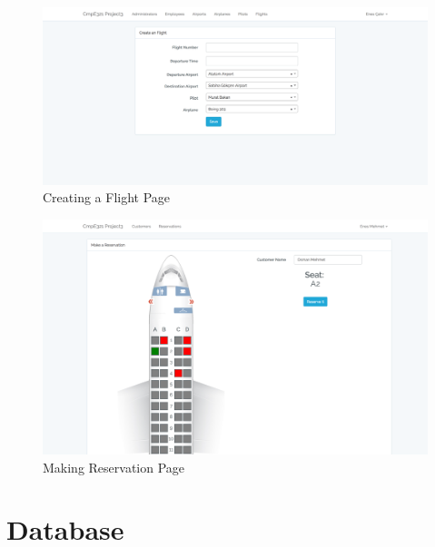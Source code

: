 \documentclass[12pt,a4paper]{article}
\begin{document}
    \begin{figure}[h!]
    \centering
    \includegraphics[width=135mm]{cmpe321_p3_ss6.png}
    \caption{Creating a Flight Page}
    \label{fig:ss6}
    \end{figure}

    \begin{figure}[h!]
    \centering
    \includegraphics[width=135mm]{cmpe321_p3_ss7.png}
    \caption{Making Reservation Page}
    \label{fig:ss7}
    \end{figure}

    \clearpage

\section{Database}
\end{document}
